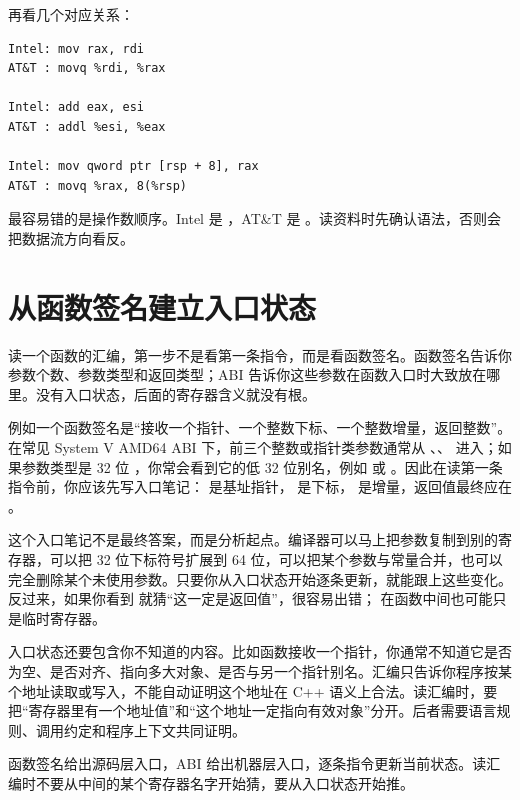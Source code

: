 再看几个对应关系：

\begin{lstlisting}
Intel: mov rax, rdi
AT&T : movq %rdi, %rax

Intel: add eax, esi
AT&T : addl %esi, %eax

Intel: mov qword ptr [rsp + 8], rax
AT&T : movq %rax, 8(%rsp)
\end{lstlisting}

\begin{warningbox}
最容易错的是操作数顺序。Intel 是 ，AT\&T 是 。读资料时先确认语法，否则会把数据流方向看反。
\end{warningbox}

\section{从函数签名建立入口状态}

读一个函数的汇编，第一步不是看第一条指令，而是看函数签名。函数签名告诉你参数个数、参数类型和返回类型；ABI 告诉你这些参数在函数入口时大致放在哪里。没有入口状态，后面的寄存器含义就没有根。

例如一个函数签名是“接收一个指针、一个整数下标、一个整数增量，返回整数”。在常见 System V AMD64 ABI 下，前三个整数或指针类参数通常从 、、 进入；如果参数类型是 32 位 ，你常会看到它的低 32 位别名，例如  或 。因此在读第一条指令前，你应该先写入口笔记： 是基址指针， 是下标， 是增量，返回值最终应在 。

这个入口笔记不是最终答案，而是分析起点。编译器可以马上把参数复制到别的寄存器，可以把 32 位下标符号扩展到 64 位，可以把某个参数与常量合并，也可以完全删除某个未使用参数。只要你从入口状态开始逐条更新，就能跟上这些变化。反过来，如果你看到  就猜“这一定是返回值”，很容易出错； 在函数中间也可能只是临时寄存器。

入口状态还要包含你不知道的内容。比如函数接收一个指针，你通常不知道它是否为空、是否对齐、指向多大对象、是否与另一个指针别名。汇编只告诉你程序按某个地址读取或写入，不能自动证明这个地址在 C++ 语义上合法。读汇编时，要把“寄存器里有一个地址值”和“这个地址一定指向有效对象”分开。后者需要语言规则、调用约定和程序上下文共同证明。

\begin{mentalmodel}
函数签名给出源码层入口，ABI 给出机器层入口，逐条指令更新当前状态。读汇编时不要从中间的某个寄存器名字开始猜，要从入口状态开始推。
\end{mentalmodel}

